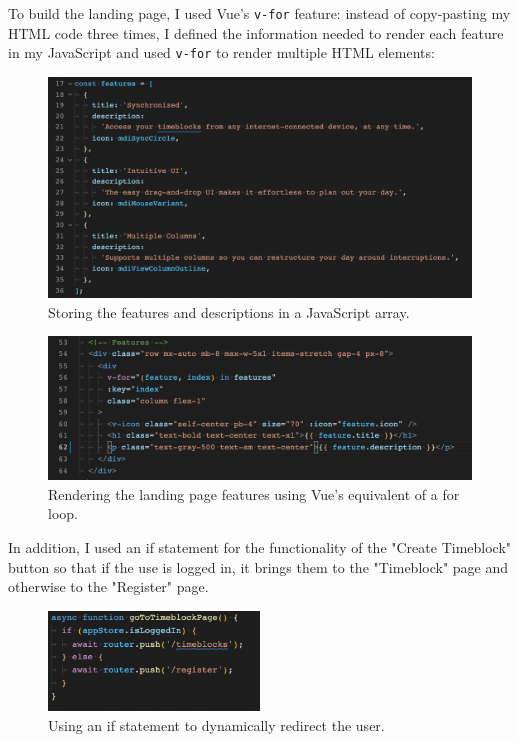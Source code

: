 \documentclass[notitlepage, 12pt]{report}
\newcommand{\code}[1]{\texttt{#1}}
\begin{document}
\newpage

To build the landing page, I used Vue's \code{v-for} feature: instead of copy-pasting my HTML code three times, I defined the information needed to render each feature in my JavaScript and used \code{v-for} to render multiple HTML elements:

\begin{figure}[H]
	\caption{Storing the features and descriptions in a JavaScript array.}
	\includegraphics[width=\textwidth]{landing-page-features.png}
\end{figure}

\begin{figure}[H]
	\caption{Rendering the landing page features using Vue's equivalent of a for loop.}
	\includegraphics[width=\textwidth]{landing-page-v-for.png}
\end{figure}

\newpage

In addition, I used an if statement for the functionality of the "Create Timeblock" button so that if the use is logged in, it brings them to the "Timeblock" page and otherwise to the "Register" page.
\begin{figure}[H]
	\centering
	\caption{Using an if statement to dynamically redirect the user.}
	\includegraphics[width=0.5\textwidth]{landing-page-go-to-timeblock-page.png}
\end{figure}
\end{document}
